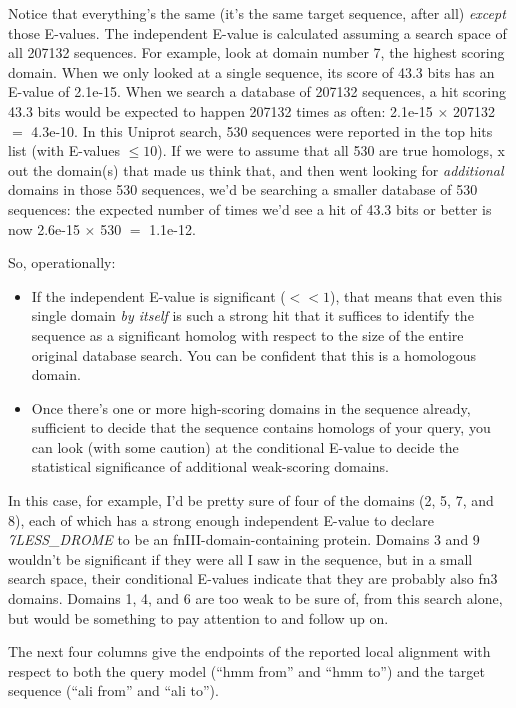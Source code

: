 Notice that everything's the same (it's the same target sequence,
after all) \emph{except} those E-values. The independent E-value is
calculated assuming a search space of all 207132 sequences. For
example, look at domain number 7, the highest scoring domain. When we
only looked at a single sequence, its score of 43.3 bits has an
E-value of 2.1e-15. When we search a database of 207132 sequences, a
hit scoring 43.3 bits would be expected to happen 207132 times as
often: 2.1e-15 $\times$ 207132 $=$ 4.3e-10. In this Uniprot search,
530 sequences were reported in the top hits list (with E-values $\leq
10$). If we were to assume that all 530 are true homologs, x out the
domain(s) that made us think that, and then went looking for
\emph{additional} domains in those 530 sequences, we'd be searching a
smaller database of 530 sequences: the expected number of times we'd
see a hit of 43.3 bits or better is now 2.6e-15 $\times$ 530 $=$
1.1e-12.

So, operationally:

\begin{itemize}
\item If the independent E-value is significant ($<<1$), that means
that even this single domain \emph{by itself} is such a strong hit
that it suffices to identify the sequence as a significant homolog
with respect to the size of the entire original database search. You
can be confident that this is a homologous domain.

\item Once there's one or more high-scoring domains in the sequence
already, sufficient to decide that the sequence contains homologs of
your query, you can look (with some caution) at the conditional
E-value to decide the statistical significance of additional
weak-scoring domains.
\end{itemize}

In this case, for example, I'd be pretty sure of four of the domains
(2, 5, 7, and 8), each of which has a strong enough independent
E-value to declare \emph{7LESS\_DROME} to be an
fnIII-domain-containing protein. Domains 3 and 9 wouldn't be
significant if they were all I saw in the sequence, but in a small
search space, their conditional E-values indicate that they are
probably also fn3 domains. Domains 1, 4, and 6 are too weak to be sure
of, from this search alone, but would be something to pay attention to
and follow up on.

The next four columns give the endpoints of the reported local
alignment with respect to both the query model (``hmm from'' and ``hmm
to'') and the target sequence (``ali from'' and ``ali to''). 

